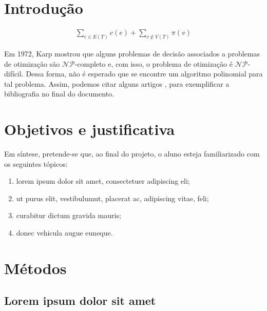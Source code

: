 \documentclass[12pt]{projeto}
\begin{document}
\begin{resumo}
    \lipsum[1]
\end{resumo}

\section{Introdução}

\lipsum[2]

\begin{align*}
    \sum_{e \in E(T)} c(e) + \sum_{v \notin V(T)} \pi(v)
\end{align*}

\lipsum[3 - 4]

Em 1972, Karp \cite{Karp72} mostrou que alguns problemas de decisão associados a problemas de otimização são $\mathcal{NP}$-completo e, com isso, o problema de otimização é $\mathcal{NP}$-difícil. Dessa forma, não é esperado que se encontre um algoritmo polinomial para tal problema. Assim, podemos citar alguns artigos \cite{BolukbasiK18, dimacs11, LjubicWPKMF05}, para exemplificar a bibliografia no final do documento.

\section{Objetivos e justificativa}

\lipsum[1]

Em síntese, pretende-se que, ao final do projeto, o aluno esteja familiarizado com os seguintes tópicos:

\begin{enumerate}[label=\roman*)]
    \item lorem ipsum dolor sit amet, consectetuer adipiscing eli;
    \item ut purus elit, vestibulumut, placerat ac, adipiscing vitae, feli;
    \item curabitur dictum gravida mauris;
    \item donec vehicula augue euneque.
\end{enumerate}

\section{Métodos}

\lipsum[2]

\subsection{Lorem ipsum dolor sit amet}
\end{document}
